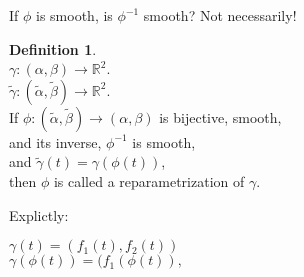 \documentclass[twocolumn,20pt,fleqn]{extarticle}
\theoremstyle{plain}
\theoremstyle{definition}
\newtheorem*{definition}{Definition}
\theoremstyle{remark}
\begin{document}
If $\phi$ is smooth, is $\phi^{-1}$ smooth? Not necessarily!



\begin{definition}~\\
  $\gamma : (\alpha, \beta) \to \mathbb{R}^2$.\\
  $\tilde{\gamma} : (\tilde{\alpha}, \tilde{\beta}) \to \mathbb{R}^2$.\\
  If $\phi : (\tilde{\alpha}, \tilde{\beta})\to (\alpha, \beta)$ is bijective, smooth, \\and its inverse, $\phi^{-1}$ is smooth,\\ and
 $\tilde{\gamma}(t) = \gamma(\phi(t))$,\\ then $\phi$ is called a reparametrization of $\gamma$.
\end{definition}

Explictly:

$\gamma(t) = (f_1(t), f_2(t))$\\
$\gamma(\phi(t)) = (f_1(\phi(t)),$


\newpage
\end{document}
